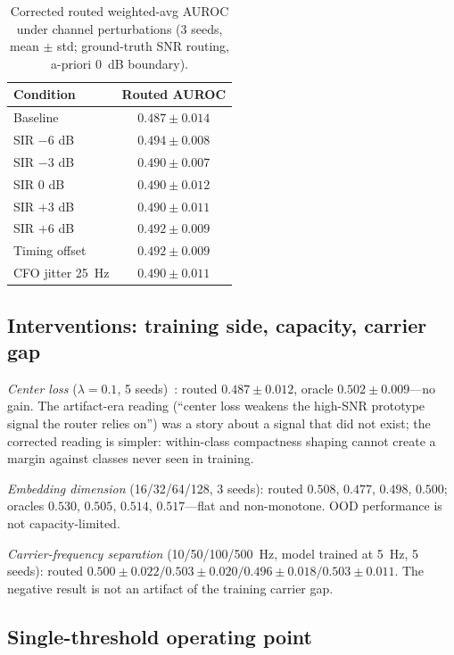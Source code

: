 \documentclass[review,12pt]{elsarticle}
\begin{document}
\begin{table}[H]
\centering
\caption{Corrected routed weighted-avg AUROC under channel
perturbations (3 seeds, mean $\pm$ std; ground-truth SNR routing,
a-priori \SI{0}{dB} boundary).}
\label{tab:robust}
\begin{tabular}{lc}
\toprule
Condition & Routed AUROC \\
\midrule
Baseline & $0.487 \pm 0.014$ \\
SIR $-6$ dB & $0.494 \pm 0.008$ \\
SIR $-3$ dB & $0.490 \pm 0.007$ \\
SIR $0$ dB & $0.490 \pm 0.012$ \\
SIR $+3$ dB & $0.490 \pm 0.011$ \\
SIR $+6$ dB & $0.492 \pm 0.009$ \\
Timing offset & $0.492 \pm 0.009$ \\
CFO jitter \SI{25}{Hz} & $0.490 \pm 0.011$ \\
\bottomrule
\end{tabular}
\end{table}

\subsection{Interventions: training side, capacity, carrier gap}
\label{sec:interventions}

\emph{Center loss} ($\lambda{=}0.1$, 5 seeds)~\cite{wen2016center}:
routed $0.487 \pm 0.012$, oracle $0.502 \pm 0.009$---no gain. The
artifact-era reading (``center loss weakens the high-SNR prototype
signal the router relies on'') was a story about a signal that did not
exist; the corrected reading is simpler: within-class compactness
shaping cannot create a margin against classes never seen in training.

\emph{Embedding dimension} (16/32/64/128, 3 seeds): routed
$0.508$, $0.477$, $0.498$, $0.500$; oracles
$0.530$, $0.505$, $0.514$, $0.517$---flat and
non-monotone. OOD performance is not capacity-limited.

\emph{Carrier-frequency separation} (10/50/100/\SI{500}{Hz}, model
trained at \SI{5}{Hz}, 5 seeds): routed
$0.500 \pm 0.022 / 0.503 \pm 0.020 / 0.496 \pm 0.018 / 0.503 \pm 0.011$.
The negative result is not an artifact of the training carrier gap.

\subsection{Single-threshold operating point}
\label{sec:oppoint}
\end{document}
